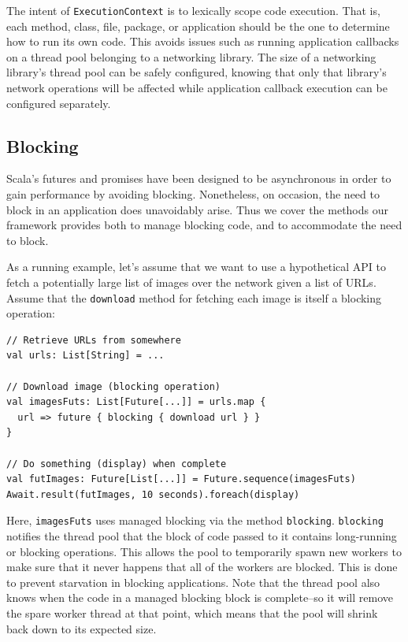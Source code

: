 The intent of \verb|ExecutionContext| is to lexically scope code execution. That
is, each method, class, file, package, or application should be the one to
determine how to run its own code. This avoids issues such as running
application callbacks on a thread pool belonging to a networking library. The
size of a networking library's thread pool can be safely configured, knowing
that only that library's network operations will be affected while application
callback execution can be configured separately.


\subsection{Blocking}
\label{sec:futures-blocking}

Scala's futures and promises have been designed to be asynchronous in order to
gain performance by avoiding blocking. Nonetheless, on occasion, the need to
block in an application does unavoidably arise. Thus we cover the methods our
framework provides both to manage blocking code, and to accommodate the need to
block.

As a running example, let's assume that we want to use a hypothetical API to
fetch a potentially large list of images over the network given a list of URLs.
Assume that the \verb|download| method for fetching each image is itself a
blocking operation:

\begin{verbatim}
// Retrieve URLs from somewhere
val urls: List[String] = ...

// Download image (blocking operation)
val imagesFuts: List[Future[...]] = urls.map {
  url => future { blocking { download url } }
}

// Do something (display) when complete
val futImages: Future[List[...]] = Future.sequence(imagesFuts)
Await.result(futImages, 10 seconds).foreach(display)
\end{verbatim}

Here, \verb|imagesFuts| uses managed blocking via the method \verb|blocking|.
\verb|blocking| notifies the thread pool that the block of code passed to it
contains long-running or blocking operations. This allows the pool to
temporarily spawn new workers to make sure that it never happens that all of the
workers are blocked. This is done to prevent starvation in blocking
applications. Note that the thread pool also knows when the code in a managed
blocking block is complete--so it will remove the spare worker thread at that
point, which means that the pool will shrink back down to its expected size.

